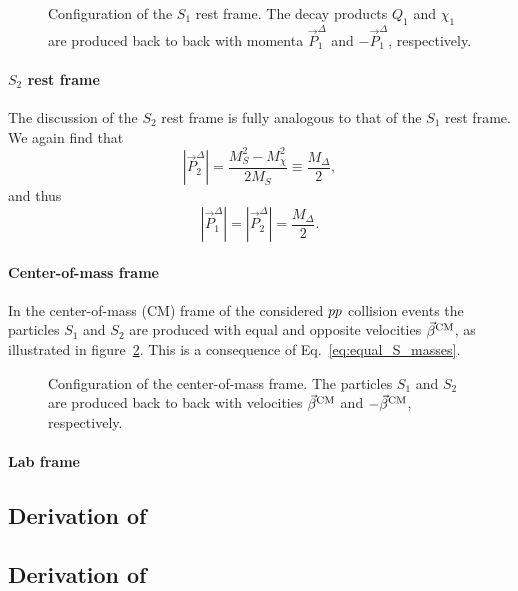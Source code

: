 \begin{figure}[htpb]
  \centering
  \caption{Configuration of the $S_1$ rest frame. The decay products $Q_1$ and $\chi_1$ are
produced back to back with momenta $\vec{P}^\Delta_1$ and $-\vec{P}^\Delta_1$, respectively. 
\label{fig:razor_S1_rest_frame}}
\end{figure}

\paragraph{$S_2$ rest frame}
The discussion of the $S_2$ rest frame is fully analogous to that of the $S_1$ rest frame. We
again find that
\begin{equation}
  |\vec{P}^\Delta_2| = \frac{M_S^2 - M_\chi^2}{2M_S} \equiv \frac{M_\Delta}{2} ,
\end{equation}
and thus
\begin{equation}
  |\vec{P}^\Delta_1| = |\vec{P}^\Delta_2| = \frac{M_\Delta}{2} .
\end{equation}


\paragraph{Center-of-mass frame}
In the center-of-mass (CM) frame of the considered ${p}{p}$ collision events the particles $S_1$
and $S_2$ are produced with equal and opposite velocities $\vec{\beta}^{\textrm{CM}}$, as
illustrated in figure~\ref{fig:razor_CM_frame}. This is a consequence of
Eq.~\ref{eq:equal_S_masses}. 

\begin{figure}[htpb]
  \centering
  \caption{Configuration of the center-of-mass frame. The particles $S_1$ and $S_2$ are
produced back to back with velocities $\vec{\beta}^{\textrm{CM}}$ and $-\vec{\beta}^{\textrm{CM}}$, respectively. 
\label{fig:razor_CM_frame}}
\end{figure}

\paragraph{Lab frame}


\subsection{Derivation of \mr \label{sec:razor_mr}}

\subsection{Derivation of \rsq \label{sec:razor_r2}}













